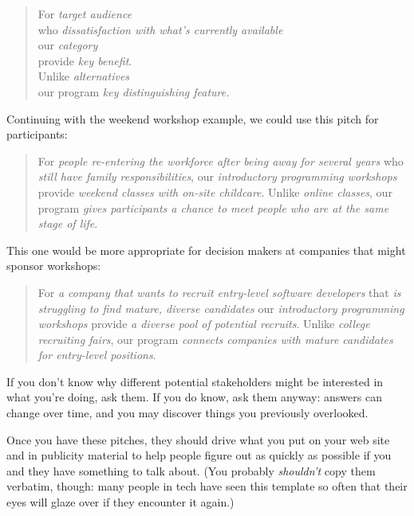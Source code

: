 \begin{quote}

  For \emph{target audience} \\
  who \emph{dissatisfaction with what's currently available} \\
  our \emph{category} \\
  provide \emph{key benefit}. \\
  Unlike \emph{alternatives} \\
  our program \emph{key distinguishing feature.}

\end{quote}

Continuing with the weekend workshop example,
we could use this pitch for participants:

\begin{quote}

  For \emph{people re-entering the workforce after being away for several years}
  who \emph{still have family responsibilities},
  our \emph{introductory programming workshops}
  provide \emph{weekend classes with on-site childcare}.
  Unlike \emph{online classes},
  our program \emph{gives participants a chance to meet people who are at the same stage of life}.

\end{quote}

\noindent
This one would be more appropriate for
decision makers at companies that might sponsor workshops:

\begin{quote}

  For \emph{a company that wants to recruit entry-level software developers}
  that \emph{is struggling to find mature, diverse candidates}
  our \emph{introductory programming workshops}
  provide \emph{a diverse pool of potential recruits}.
  Unlike \emph{college recruiting fairs},
  our program \emph{connects companies with mature candidates for entry-level positions}.

\end{quote}

If you don't know why different potential stakeholders might be interested in what you're doing,
ask them.
If you do know,
ask them anyway:
answers can change over time,
and you may discover things you previously overlooked.

Once you have these pitches,
they should drive what you put on your web site and in publicity material
to help people figure out as quickly as possible
if you and they have something to talk about.
(You probably \emph{shouldn't} copy them verbatim,
though:
many people in tech have seen this template so often that
their eyes will glaze over if they encounter it again.)

